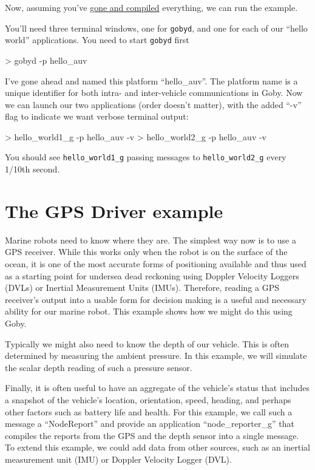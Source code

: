 \documentclass[11pt, letterpaper, oneside]{memoir}
\begin{document}
Now, assuming you've \href{http://gobysoft.com/doc}{gone and compiled} everything, we can run the example.

You'll need three terminal windows, one for \verb|gobyd|, and one for each of our ``hello world'' applications. You need to start \verb|gobyd| first
\begin{boxedverbatim}
> gobyd -p hello_auv
\end{boxedverbatim}
\resetbvlinenumber
I've gone ahead and named this platform ``hello\_auv''. The platform name is a unique identifier for both intra- and inter-vehicle communications in Goby. Now we can launch our two applications (order doesn't matter), with the added ``-v'' flag to indicate we want verbose terminal output:

\begin{boxedverbatim}
> hello_world1_g -p hello_auv -v
> hello_world2_g -p hello_auv -v
\end{boxedverbatim}
\resetbvlinenumber

You should see \verb|hello_world1_g| passing messages to \verb|hello_world2_g| every 1/10th second.

\chapter{The GPS Driver example}

Marine robots need to know where they are. The simplest way now is to use a GPS receiver. While this works only when the robot is on the surface of the ocean, it is one of the most accurate forms of positioning available and thus used as a starting point for undersea dead reckoning using Doppler Velocity Loggers (DVLs) or Inertial Measurement Units (IMUs). Therefore, reading a GPS receiver's output into a usable form for decision making is a useful and necessary ability for our marine robot. This example shows how we might do this using Goby.

Typically we might also need to know the depth of our vehicle. This is often determined by measuring the ambient pressure. In this example, we will simulate the scalar depth reading of such a pressure sensor.

Finally, it is often useful to have an aggregate of the vehicle's status that includes a snapshot of the vehicle's location, orientation, speed, heading, and perhaps other factors such as battery life and health. For this example, we call such a message a ``NodeReport'' and provide an application ``node\_reporter\_g'' that compiles the reports from the GPS and the depth sensor into a single message. To extend this example, we could add data from other sources, such as an inertial measurement unit (IMU) or Doppler Velocity Logger (DVL).
\end{document}
